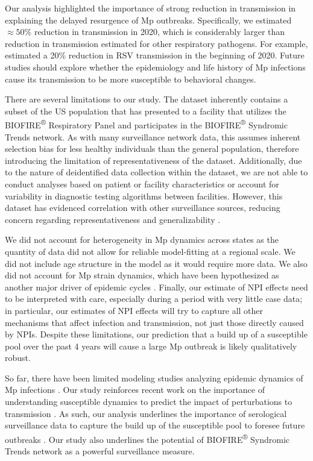 \documentclass[12pt]{article}
\begin{document}
Our analysis highlighted the importance of strong reduction in transmission in explaining the delayed resurgence of Mp outbreaks.
Specifically, we estimated $\approx 50\%$ reduction in transmission in 2020, which is considerably larger than reduction in transmission estimated for other respiratory pathogens.
For example, \cite{baker2020impact} estimated a 20\% reduction in RSV transmission in the beginning of 2020.
Future studies should explore whether the epidemiology and life history of Mp infections cause its transmission to be more susceptible to behavioral changes.

There are several limitations to our study.
The dataset inherently contains a subset of the US population that has presented to a facility that utilizes the BIOFIRE\textsuperscript{®} Respiratory Panel and participates in the BIOFIRE\textsuperscript{®} Syndromic Trends network. As with many surveillance network data, this assumes inherent selection bias for less healthy individuals than the general population, therefore introducing the limitation of representativeness of the dataset. Additionally, due to the nature of deidentified data collection within the dataset, we are not able to conduct analyses based on patient or facility characteristics or account for variability in diagnostic testing algorithms between facilities. However, this dataset has evidenced correlation with other surveillance sources, reducing concern regarding representativeness and generalizability \citep{meyers2018automated}. 

We did not account for heterogeneity in Mp dynamics across states as the quantity of data did not allow for reliable model-fitting at a regional scale.
We did not include age structure in the model as it would require more data.
We also did not account for Mp strain dynamics, which have been hypothesized as another major driver of epidemic cycles \citep{kenri2008genotyping,zhang2019positively}.
Finally, our estimate of NPI effects need to be interpreted with care, especially during a period with very little case data;
in particular, our estimates of NPI effects will try to capture all other mechanisms that affect infection and transmission, not just those directly caused by NPIs.
Despite these limitations, our prediction that a build up of a susceptible pool over the past 4 years will cause a large Mp outbreak is likely qualitatively robust.

So far, there have been limited modeling studies analyzing epidemic dynamics of Mp infections \citep{omori2015determinant,zhang2019positively}. 
Our study reinforces recent work on the importance of understanding susceptible dynamics to predict the impact of perturbations to transmission \citep{baker2020impact,park2024predicting}.
As such, our analysis underlines the importance of serological surveillance data to capture the build up of the susceptible pool to foresee future outbreaks \citep{mina2020global,nguyen2022enterovirus}.
Our study also underlines the potential of BIOFIRE\textsuperscript{®} Syndromic Trends network as a powerful surveillance measure.
\end{document}

